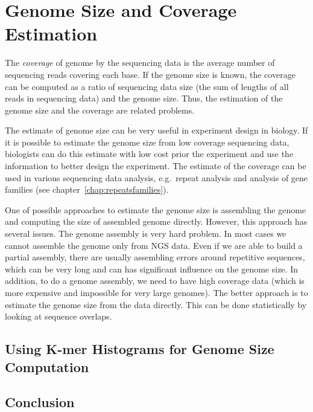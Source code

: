 \chapter{Genome Size and Coverage Estimation}

The \emph{coverage} of genome by the sequencing data is the average number of sequencing reads covering each base. If the genome size is known, the coverage can be computed as a ratio of sequencing data size (the sum of lengths of all reads in sequencing data) and the genome size. Thus, the estimation of the genome size and the coverage are related problems.

The estimate of genome size can be very useful in experiment design in biology. If it is possible to estimate the genome size from low coverage sequencing data, biologists can do this estimate with low cost prior the experiment and use the information to better design the experiment.
The estimate of the coverage can be used in various sequencing data analysis, e.g.\ repeat analysis and analysis of gene families (see chapter~\ref{chap:repeatsfamilies}). 

One of possible approaches to estimate the genome size is assembling the genome and computing the size of assembled genome directly. However, this approach has several issues. The genome assembly is very hard problem. In most cases we cannot assemble the genome only from NGS data. Even if we are able to build a partial assembly, there are usually assembling errors around repetitive sequences, which can be very long and can has significant influence on the genome size. In addition, to do a genome assembly, we need to have high coverage data (which is more expensive and impossible for very large genomes).
The better approach is to estimate the genome size from the data directly. This can be done statistically by looking at sequence overlaps. 

\section{Using K-mer Histograms for Genome Size Computation}


%
%

\section{Conclusion}
